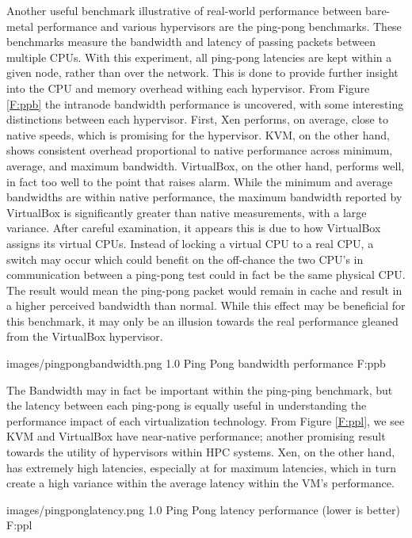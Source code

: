 Another useful benchmark illustrative of real-world performance between bare-metal performance and various hypervisors are the ping-pong benchmarks.  These benchmarks measure the bandwidth and latency of passing packets between multiple CPUs.  With this experiment, all ping-pong latencies are kept within a given node, rather than over the network.  This is done to provide further insight into the CPU and memory overhead withing each hypervisor.  From Figure \ref{F:ppb} the intranode bandwidth performance is uncovered, with some interesting distinctions between each hypervisor.  First, Xen performs, on average, close to native speeds, which is promising for the hypervisor.  KVM, on the other hand, shows consistent overhead proportional to native performance across minimum, average, and maximum bandwidth.  VirtualBox, on the other hand, performs well, in fact too well to the point that raises alarm.  While the minimum and average bandwidths are within native performance, the maximum bandwidth reported by VirtualBox is significantly greater than native measurements, with a large variance.  After careful examination, it appears this is due to how VirtualBox assigns its virtual CPUs.  Instead of locking a virtual CPU to a real CPU, a switch may occur which could benefit on the off-chance the two CPU's in communication between a ping-pong test could in fact be the same physical CPU.  The result would mean the ping-pong packet would remain in cache and result in a higher perceived bandwidth than normal.  While this effect may be beneficial for this benchmark, it may only be an illusion towards the real performance gleaned from the VirtualBox hypervisor. 

  {images/pingpongbandwidth.png}
  {1.0}
  {Ping Pong bandwidth performance}
  {F:ppb}

The Bandwidth may in fact be important within the ping-ping benchmark, but the latency between each ping-pong is equally useful in understanding the performance impact of each virtualization technology.  From Figure \ref{F:ppl}, we see KVM and VirtualBox have near-native performance; another promising result towards the utility of hypervisors within HPC systems.  Xen, on the other hand, has extremely high latencies, especially at for maximum latencies, which in turn create a high variance within the average latency within the VM's performance.  


  {images/pingponglatency.png}
  {1.0}
  {Ping Pong latency performance (lower is better)}
  {F:ppl}



